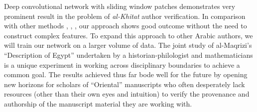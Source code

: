 \documentclass[conference,a4paper,twocolumn]{IEEEtran}
\begin{document}
Deep convolutional network with sliding window patches demonstrates very prominent result in the problem of {\it al-Khitat} author verification. In comparison with other methods \cite{MBulacu}, \cite{MBulacu1}, \cite{DFecker}, \cite{Salvador} our approach shows good outcome without the need to construct complex features. To expand this approach to other Arabic authors, we will train our network on a larger volume of data. The joint study of al-Maqrizi's ``Description of Egypt'' undertaken by a historian-philologist and mathematicians is a unique experiment in working across disciplinary boundaries to achieve a common goal. The results achieved thus far bode well for the future by opening new horizons for scholars of ``Oriental'' manuscripts who often desperately lack resources (other than their own eyes and intuition) to verify the provenance and authorship of the manuscript material they are working with.


%
%
%
\end{document}

